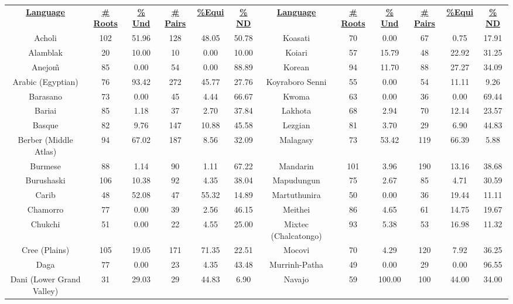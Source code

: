 \begin{tabular}{cccccccccccc}
\underline{\textbf{Language}} & \underline{\textbf{\# Roots}} & \underline{\textbf{\% Und}} & \underline{\textbf{\# Pairs}} & \underline{\textbf{\%Equi}} & \underline{\textbf{\% ND}} & \underline{\textbf{Language}} & \underline{\textbf{\# Roots}} & \underline{\textbf{\% Und}} & \underline{\textbf{\# Pairs}} & \underline{\textbf{\%Equi}} & \underline{\textbf{\% ND}} \\
Acholi & 102 & 51.96 & 128 & 48.05 & 50.78 & Koasati & 70 & 0.00 & 67 & 0.75 & 17.91 \\
Alamblak & 20 & 10.00 & 10 & 0.00 & 10.00 & Koiari & 57 & 15.79 & 48 & 22.92 & 31.25 \\
Anejo\~{m} & 85 & 0.00 & 54 & 0.00 & 88.89 & Korean & 94 & 11.70 & 88 & 27.27 & 34.09 \\
Arabic (Egyptian) & 76 & 93.42 & 272 & 45.77 & 27.76 & Koyraboro Senni & 55 & 0.00 & 54 & 11.11 & 9.26 \\
Barasano & 73 & 0.00 & 45 & 4.44 & 66.67 & Kwoma & 63 & 0.00 & 36 & 0.00 & 69.44 \\
Bariai & 85 & 1.18 & 37 & 2.70 & 37.84 & Lakhota & 68 & 2.94 & 70 & 12.14 & 23.57 \\
Basque & 82 & 9.76 & 147 & 10.88 & 45.58 & Lezgian & 81 & 3.70 & 29 & 6.90 & 44.83 \\
Berber (Middle Atlas) & 94 & 67.02 & 187 & 8.56 & 32.09 & Malagasy & 73 & 53.42 & 119 & 66.39 & 5.88 \\
Burmese & 88 & 1.14 & 90 & 1.11 & 67.22 & Mandarin & 101 & 3.96 & 190 & 13.16 & 38.68 \\
Burushaski & 106 & 10.38 & 92 & 4.35 & 38.04 & Mapudungun & 75 & 2.67 & 85 & 4.71 & 30.59 \\
Carib & 48 & 52.08 & 47 & 55.32 & 14.89 & Martuthunira & 50 & 0.00 & 36 & 19.44 & 11.11 \\
Chamorro & 77 & 0.00 & 39 & 2.56 & 46.15 & Meithei & 86 & 4.65 & 61 & 14.75 & 19.67 \\
Chukchi & 51 & 0.00 & 22 & 4.55 & 25.00 & Mixtec (Chalcatongo) & 93 & 5.38 & 53 & 16.98 & 11.32 \\
Cree (Plains) & 105 & 19.05 & 171 & 71.35 & 22.51 & Mocovi & 70 & 4.29 & 120 & 7.92 & 36.25 \\
Daga & 77 & 0.00 & 23 & 4.35 & 43.48 & Murrinh-Patha & 49 & 0.00 & 29 & 0.00 & 96.55 \\
Dani (Lower Grand Valley) & 31 & 29.03 & 29 & 44.83 & 6.90 & Navajo & 59 & 100.00 & 100 & 44.00 & 34.00 \\

\end{tabular}
